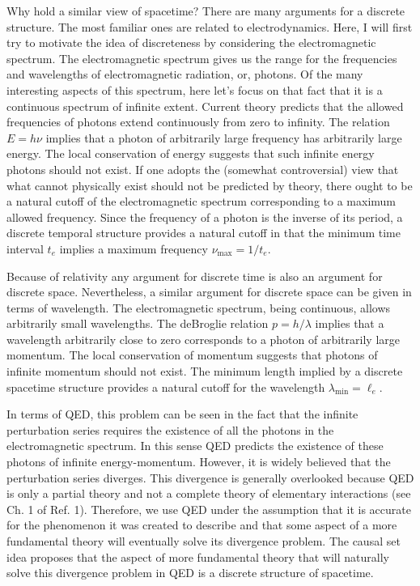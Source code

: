 \documentclass[aps,amssymb,12pt]{revtex4-2}
\begin{document}
Why hold a similar view of spacetime? There are many arguments for a
discrete structure. The most familiar ones are related to electrodynamics.
Here, I will first try to motivate the idea of discreteness by considering
the electromagnetic spectrum. The electromagnetic spectrum gives us the
range for the frequencies and wavelengths of electromagnetic radiation, or,
photons. Of the many interesting aspects of this spectrum, here let's focus
on that fact that it is a continuous spectrum of infinite extent. Current
theory predicts that the allowed frequencies of photons extend continuously
from zero to infinity. The relation $E=h\nu $ implies that a photon of
arbitrarily large frequency has arbitrarily large energy. The local
conservation of energy suggests that such infinite energy photons should not
exist. If one adopts the (somewhat controversial) view that what cannot
physically exist should not be predicted by theory, there ought to be a
natural cutoff of the electromagnetic spectrum corresponding to a maximum
allowed frequency. Since the frequency of a photon is the inverse of its
period, a discrete temporal structure provides a natural cutoff in that the
minimum time interval $t_e$ implies a maximum frequency $\nu _{\max }=1/t_e$.

Because of relativity any argument for discrete time is also an argument for
discrete space. Nevertheless, a similar argument for discrete space can be
given in terms of wavelength. The electromagnetic spectrum, being
continuous, allows arbitrarily small wavelengths. The deBroglie relation $%
p=h/\lambda $ implies that a wavelength arbitrarily close to zero
corresponds to a photon of arbitrarily large momentum. The local
conservation of momentum suggests that photons of infinite momentum should
not exist. The minimum length implied by a discrete spacetime structure
provides a natural cutoff for the wavelength $\lambda _{\min }=\ell _e$.

In terms of QED, this problem can be seen in the fact that the infinite
perturbation series requires the existence of all the photons in the
electromagnetic spectrum. In this sense QED predicts the existence of these
photons of infinite energy-momentum. However, it is widely believed that the
perturbation series diverges. This divergence is generally overlooked
because QED is only a partial theory and not a complete theory of elementary
interactions (see Ch. 1 of Ref. 1). Therefore, we use QED under the
assumption that it is accurate for the phenomenon it was created to describe
and that some aspect of a more fundamental theory will eventually solve its
divergence problem. The causal set idea proposes that the aspect of more
fundamental theory that will naturally solve this divergence problem in QED
is a discrete structure of spacetime.
\end{document}
